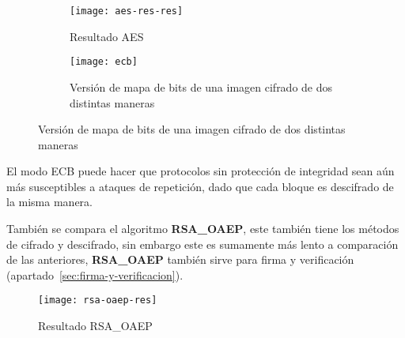\documentclass[../main.tex]{subfiles}
\begin{document}
\begin{figure}
\begin{subfigure}[b]{0.55\textwidth}
  \centering
  \texttt{[image: aes-res-res]}
  \caption{Resultado AES}\label{fig:aes}
\end{subfigure}
\hfill{}
\begin{subfigure}[b]{0.4\textwidth}
  \centering
  \texttt{[image: ecb]}
  \caption{Versión de mapa de bits de una imagen cifrado de dos distintas maneras}\label{fig:ejem}
\end{subfigure}
\end{figure}

\newpage{}


El modo ECB puede hacer que protocolos sin protección de integridad sean aún más
susceptibles a ataques de repetición, dado que cada bloque es descifrado de la misma
manera.

También se compara el algoritmo \textbf{RSA\_OAEP}, este también tiene los métodos
de cifrado y descifrado, sin embargo este es sumamente más lento a comparación
de las anteriores, \textbf{RSA\_OAEP} también sirve para firma y verificación
(apartado~\ref{sec:firma-y-verificacion}).
\begin{figure}[ht]
  \centering{}
  \texttt{[image: rsa-oaep-res]}
  \caption{Resultado RSA\_OAEP}\label{fig:rsa-oaep}
\end{figure}
\end{document}
